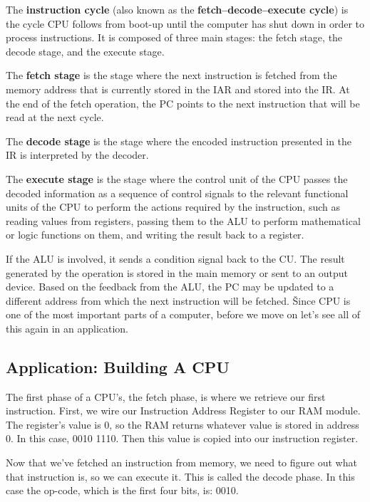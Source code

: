 \ee

The \textbf{instruction cycle} (also known as the \textbf{fetch–decode–execute cycle}) is the cycle CPU follows from
boot-up until the computer has shut down in order to process instructions. It is composed of three main stages: the
fetch stage, the decode stage, and the execute stage.
\ed

The \textbf{fetch stage} is the stage where the next instruction is fetched from the memory address that is currently
stored in the IAR and stored into the IR. At the end of the fetch operation, the PC points to the next instruction
that will be read at the next cycle.
\ed

The \textbf{decode stage} is the stage where the encoded instruction presented in the IR is interpreted by the
decoder.
\ed

The \textbf{execute stage} is the stage where the control unit of the CPU passes the decoded information as a
sequence of control signals to the relevant functional units of the CPU to perform the actions required by the
instruction, such as reading values from registers, passing them to the ALU to perform mathematical or logic
functions on them, and writing the result back to a register.
\ed

If the ALU is involved, it sends a condition signal back to the CU. The result generated by the operation is stored
in the main memory or sent to an output device. Based on the feedback from the ALU, the PC may be updated to a
different address from which the next instruction will be fetched. \v

Since CPU is one of the most important parts of a computer, before we move on let's see all of this again in an
application.

\subsection{Application: Building A CPU}

The first phase of a CPU's, the fetch phase, is where we retrieve our first instruction. First, we wire our
Instruction Address Register to our RAM module. The register's value is 0, so the RAM returns whatever value is
stored in address 0. In this case, 0010 1110. Then this value is copied into our instruction register.


Now that we've fetched an instruction from memory, we need to figure out what that instruction is, so we can execute
it. This is called the decode phase. In this case the op-code, which is the first four bits, is: 0010.

